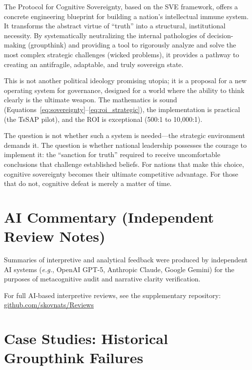 \documentclass[11pt,a4paper]{article}
\begin{document}
The Protocol for Cognitive Sovereignty, based on the SVE framework, offers a concrete engineering blueprint for building a nation's intellectual immune system. It transforms the abstract virtue of ``truth'' into a structural, institutional necessity. By systematically neutralizing the internal pathologies of decision-making (groupthink) and providing a tool to rigorously analyze and solve the most complex strategic challenges (wicked problems), it provides a pathway to creating an antifragile, adaptable, and truly sovereign state.

This is not another political ideology promising utopia; it is a proposal for a new operating system for governance, designed for a world where the ability to think clearly is the ultimate weapon. The mathematics is sound (Equations~\eqref{eq:sovereignty}--\eqref{eq:roi_strategic}), the implementation is practical (the TsSAP pilot), and the ROI is exceptional (500:1 to 10,000:1).

The question is not whether such a system is needed—the strategic environment demands it. The question is whether national leadership possesses the courage to implement it: the ``sanction for truth'' required to receive uncomfortable conclusions that challenge established beliefs. For nations that make this choice, cognitive sovereignty becomes their ultimate competitive advantage. For those that do not, cognitive defeat is merely a matter of time.


\section*{AI Commentary (Independent Review Notes)}
Summaries of interpretive and analytical feedback were produced by independent AI systems 
(\textit{e.g.}, OpenAI GPT-5, Anthropic Claude, Google Gemini) 
for the purposes of metacognitive audit and narrative clarity verification.  

For full AI-based interpretive reviews, see the supplementary repository:  
\href{https://codeberg.org/skovnats/SVE-Systemic-Verification-Engineering/tree/master/Reviews}{github.com/skovnats/Reviews}





\clearpage
\appendix

\section{Case Studies: Historical Groupthink Failures}
\label{app:casestudies}
\end{document}
